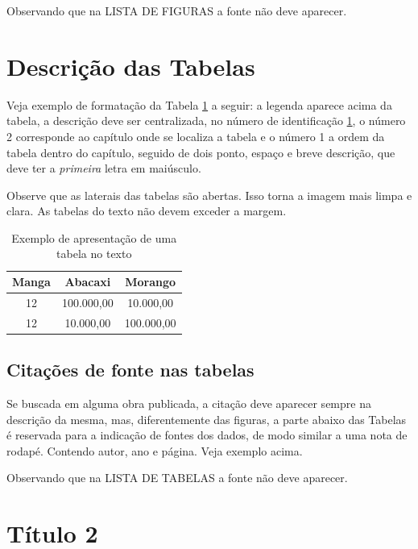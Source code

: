 Observando que na LISTA DE FIGURAS a fonte não deve aparecer.

\section{Descrição das Tabelas}

Veja exemplo de formatação da Tabela \ref{tab:exemplo-texto} a seguir: a legenda aparece acima da tabela, a descrição deve ser centralizada, no número de identificação \ref{tab:exemplo-texto}, o número 2 corresponde ao capítulo onde se localiza a tabela e o número 1 a ordem da tabela dentro do capítulo, seguido de dois ponto, espaço e  breve descrição, que deve ter a \emph{primeira} letra em maiúsculo.

Observe que as laterais das tabelas são abertas. Isso torna a imagem mais limpa e clara. As tabelas do texto não devem exceder a margem.

\begin{table}[h]
    \caption{Exemplo de apresentação de uma tabela no texto}
    \begin{center}
        \begin{tabular}{ c | c | c }
            \hline
            Manga & Abacaxi & Morango \\
            \hline
            12 & 100.000,00 & 10.000,00 \\
            \hline
            12 & 10.000,00 & 100.000,00 \\
            \hline
        \end{tabular}
    \end{center}
    \label{tab:exemplo-texto}
\end{table}

\subsection{Citações de fonte nas tabelas}

Se buscada em alguma obra publicada, a citação deve aparecer sempre na descrição da mesma, mas, diferentemente das figuras, a parte abaixo das Tabelas é reservada para a indicação de fontes dos dados, de modo similar a uma nota de rodapé. Contendo autor, ano e página. Veja exemplo acima.

Observando que na LISTA DE TABELAS a fonte não deve aparecer.

\section{Título 2}

